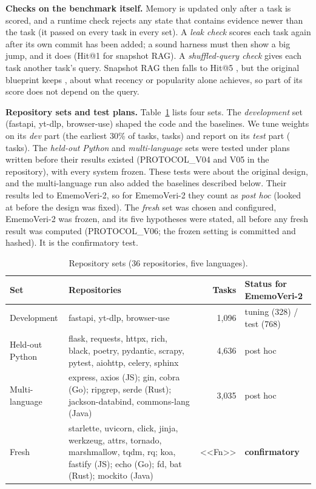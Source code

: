 \documentclass[conference]{IEEEtran}
\newcommand{\sys}{EmemoVeri}
\begin{document}
\begin{table}[t]\centering\footnotesize\setlength{\tabcolsep}{3pt}
\resizebox{\columnwidth}{!}{}
\caption{Development repositories and task selection. Clock anomalies are commits whose recorded timestamp is earlier than the running clock.}
\label{tab:data}
\end{table}

\textbf{Checks on the benchmark itself.} Memory is updated only after a task is scored, and a runtime check rejects any state that contains evidence newer than the task (it passed on every task in every set). A \emph{leak check} scores each task again after its own commit has been added; a sound harness must then show a big jump, and it does (Hit@1 \leakSnapOne{} for snapshot RAG). A \emph{shuffled-query check} gives each task another task's query. Snapshot RAG then falls to Hit@5 \shufSnapFive{}, but the original blueprint keeps \shufEmvFive{}, about what recency or popularity alone achieves, so part of its score does not depend on the query.

\textbf{Repository sets and test plans.} Table~\ref{tab:sets} lists four sets. The \emph{development} set (fastapi, yt-dlp, browser-use) shaped the code and the baselines. We tune weights on its \emph{dev} part (the earliest 30\% of tasks, \nDev{} tasks) and report on its \emph{test} part (\nTest{} tasks). The \emph{held-out Python} and \emph{multi-language} sets were tested under plans written before their results existed (PROTOCOL\_V04 and V05 in the repository), with every system frozen. These tests were about the original design, and the multi-language run also added the baselines described below. Their results led to \sys{}-2, so for \sys{}-2 they count as \emph{post hoc} (looked at before the design was fixed). The \emph{fresh} set was chosen and configured, \sys{}-2 was frozen, and its five hypotheses were stated, all before any fresh result was computed (PROTOCOL\_V06; the frozen setting is committed and hashed). It is the confirmatory test.

\begin{table}[t]\centering\footnotesize\setlength{\tabcolsep}{3pt}
\begin{tabular}{@{}l p{} r p{}@{}}
\toprule
Set & Repositories & Tasks & Status for \sys{}-2 \\
\midrule
Development & fastapi, yt-dlp, browser-use & 1{,}096 & tuning (328) / test (768) \\
Held-out Python & flask, requests, httpx, rich, black, poetry, pydantic, scrapy, pytest, aiohttp, celery, sphinx & 4{,}636 & post hoc \\
Multi-language & express, axios (JS); gin, cobra (Go); ripgrep, serde (Rust); jackson-databind, commons-lang (Java) & 3{,}035 & post hoc \\
Fresh & starlette, uvicorn, click, jinja, werkzeug, attrs, tornado, marshmallow, tqdm, rq; koa, fastify (JS); echo (Go); fd, bat (Rust); mockito (Java) & <<Fn>> & \textbf{confirmatory} \\
\bottomrule
\end{tabular}
\caption{Repository sets (36 repositories, five languages).}
\label{tab:sets}
\end{table}
\end{document}
